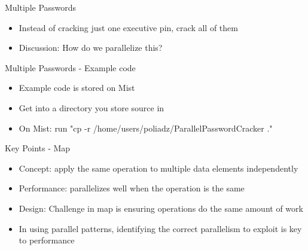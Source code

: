 \documentclass[xcolor=dvipsnames]{beamer}
\begin{document}
	\begin{frame}{Multiple Passwords}
		\begin{itemize}
			\item Instead of cracking just one executive pin, crack all of them
			\item Discussion: How do we parallelize this?
		\end{itemize}
	\end{frame}
	
	\begin{frame}{Multiple Passwords - Example code}
		\begin{itemize}
      \item Example code is stored on Mist
      \item Get into a directory you store source in 
			\item On Mist: run "cp -r /home/users/poliadz/ParallelPasswordCracker ."
		\end{itemize}
	\end{frame}
	
  \begin{frame}{Key Points - Map}
		\begin{itemize}
      \item Concept: apply the same operation to multiple data elements independently
      \item Performance: parallelizes well when the operation is the same 
      \item Design: Challenge in map is ensuring operations do the same amount of work
			\item In using parallel patterns, identifying the correct parallelism to exploit is key to performance
		\end{itemize}
	\end{frame}
\end{document}
